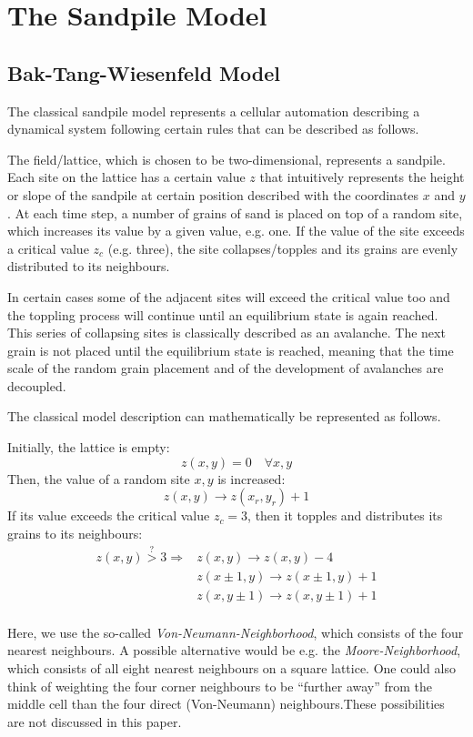 \chapter{The Sandpile Model}
\thispagestyle{fancy}

\section{Bak-Tang-Wiesenfeld Model}

The classical sandpile model represents a cellular automation describing a dynamical system following certain rules that can be described as follows.

The field/lattice, which is chosen to be two-dimensional, represents a sandpile. Each site on the lattice has a certain value $z$ that intuitively represents the height or slope of the sandpile at certain position described with the coordinates $x$ and $y$. At each time step, a number of grains of sand is placed on top of a random site, which increases its value by a given value, e.g. one. If the value of the site exceeds a critical value $z_c$ (e.g. three), the site collapses/topples and its grains are evenly distributed to its neighbours.

In certain cases some of the adjacent sites will exceed the critical value too and the toppling process will continue until an equilibrium state is again reached. This series of collapsing sites is classically described as an avalanche. The next grain is not placed until the equilibrium state is reached, meaning that the time scale of the random grain placement and of the development of avalanches are decoupled.

The classical model description can mathematically be represented as follows.

Initially, the lattice is empty:
\[
z(x,y) = 0 \quad\forall x, y
\]
Then, the value of a random site $x,y$ is increased:
\[
z(x,y) \to z(x_r,y_r) + 1
\]
If its value exceeds the critical value $z_c=3$, then it topples and distributes its grains to its neighbours:
\[
\begin{aligned}
z(x,y) \overset{?}{>} 3 \Rightarrow & z(x,y) \to z(x,y)-4 \\
 & z(x\pm 1,y) \to z(x\pm 1,y)+1 \\
 & z(x,y\pm 1) \to z(x,y\pm 1)+1 \\
\end{aligned}
\]

Here, we use the so-called \emph{Von-Neumann-Neighborhood}, which consists of the four nearest neighbours. A possible alternative would be e.g. the \emph{Moore-Neighborhood}, which consists of all eight nearest neighbours on a square lattice. One could also think of weighting the four corner neighbours to be ``further away'' from the middle cell than the four direct (Von-Neumann) neighbours.These possibilities are not discussed in this paper.

